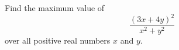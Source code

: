 Find the maximum value of
\[\dfrac{(3x+4y)^2}{x^2+y^2}\]
over all positive real numbers $x$ and $y$.

